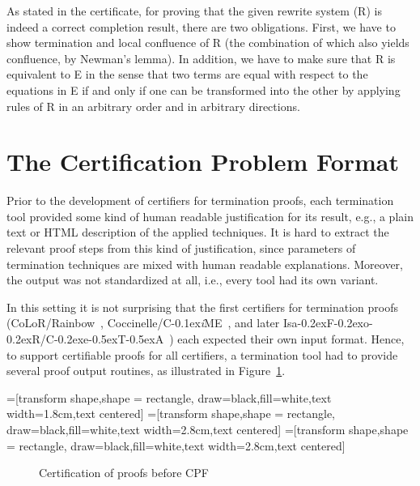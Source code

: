 \documentclass[USenglish]{eptcs}
\newcommand\cime{\textsf{C\kern-0.1ex\textsl{i}ME}\xspace}
\newlength{\len}
\newcommand{\rFI}[1]{Figure~\ref{#1}}
\newcommand\rainbow{\textsf{Rainbow}\xspace}
\newcommand\colorr{\textsf{CoLoR}\xspace}
\newcommand\cocci{\textsf{Coccinelle}\xspace}
\newcommand\isafor{\textsf{Isa\kern-0.2exF\kern-0.2exo\kern-0.2exR}\xspace}
\newcommand\ceta{\textsf{C\kern-0.2exe\kern-0.5exT\kern-0.5exA}\xspace}
\newcommand\colrain{\colorr/\rainbow}
\newcommand\coccime{\cocci/\cime}
\newcommand\isaceta{\isafor/\ceta}
\begin{document}
As stated in the certificate, for proving that the given rewrite system (R)
is indeed a correct completion result, there are two obligations.
First, we have to show termination and local
confluence of R (the combination of which also yields confluence, by Newman's lemma).
In addition, we have to make sure that R is equivalent to E in the sense that
two terms are equal with respect to the equations in E if and only if one can be
transformed into the other by applying rules of R in an arbitrary order and in
arbitrary directions.


\section{The Certification Problem Format}

Prior to the development of certifiers for termination proofs, each termination
tool provided some kind of human readable justification for its result, e.g., a
plain text or HTML description of the applied techniques.  It is hard to extract
the relevant proof steps from this kind of justification, since parameters of
termination techniques are mixed with human readable explanations. Moreover, the
output was not standardized at all, i.e., every tool had its own variant. 

In this setting it is not surprising that the first certifiers for
termination proofs (\colrain~\cite{color}, \coccime~\cite{a3pat-cime}, and later
\isaceta~\cite{ceta-tphols}) each expected their own input format.  Hence, to
support certifiable proofs for all certifiers, a termination tool had to provide
several proof output routines, as illustrated in \rFI{before}. 

=[transform shape,shape = rectangle, draw=black,fill=white,text width=1.8cm,text centered] 
=[transform shape,shape = rectangle, draw=black,fill=white,text width=2.8cm,text centered] 
=[transform shape,shape = rectangle, draw=black,fill=white,text width=2.8cm,text centered] 

\begin{figure}
\centering
{}
\caption{\label{before}Certification of proofs before CPF}
\end{figure}
\end{document}
